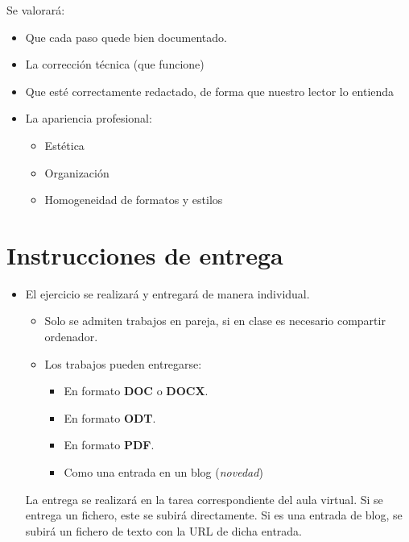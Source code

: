 Se valorará:
\begin{itemize}
\item Que cada paso quede bien documentado. 
\item La corrección técnica (que funcione)
\item Que esté correctamente redactado, de forma que nuestro lector lo entienda 
\item La apariencia profesional:
  \begin{itemize}
  \item Estética
  \item Organización
  \item Homogeneidad de formatos y estilos
  \end{itemize}
\end{itemize}

\section{Instrucciones de entrega}
\begin{itemize}
\item El ejercicio se realizará y entregará de manera individual.
  \begin{itemize}
  \item Solo se admiten trabajos en pareja, si en clase es necesario compartir ordenador.


  \item Los trabajos pueden entregarse:
    \begin{itemize}
    \item En formato \textbf{DOC} o \textbf{DOCX}.
    \item En formato \textbf{ODT}.
    \item En formato \textbf{PDF}. 
    \item Como una entrada en un blog (\textit{novedad})  
    \end{itemize}
  \end{itemize}

  La entrega se realizará en la tarea correspondiente del aula virtual. Si se entrega un fichero, este se subirá directamente. Si es una entrada de blog, se subirá un fichero de texto con la URL de dicha entrada.

  
\end{itemize}

